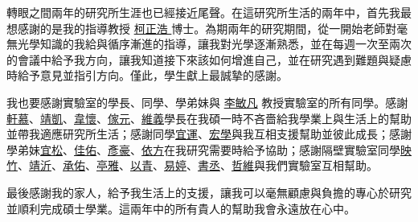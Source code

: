 
\begin{acknowledgement}
	\vspace{-1cm}
轉眼之間兩年的研究所生涯也已經接近尾聲。在這研究所生活的兩年中，首先我最想感謝的是我的指導教授 \underline{ 柯正浩 } 博士。為期兩年的研究期間，從一開始老師對毫無光學知識的我給與循序漸進的指導，讓我對光學逐漸熟悉，並在每週一次至兩次的會議中給予我方向，讓我知道接下來該如何增進自己，並在研究遇到難題與疑慮時給予意見並指引方向。僅此，學生獻上最誠摯的感謝。
\par
我也要感謝實驗室的學長、同學、學弟妹與 \underline{李敏凡} 教授實驗室的所有同學。感謝\underline{軒慕}、\underline{靖凱}、\underline{韋懷}、\underline{傢元}、\underline{維義}學長在我碩一時不吝嗇給我學業上與生活上的幫助並帶我適應研究所生活；感謝同學\underline{宜運}、\underline{宏學}與我互相支援幫助並彼此成長；感謝學弟妹\underline{宜松}、\underline{佳佑}、\underline{彥豪}、\underline{依方}在我研究需要時給予協助；感謝隔壁實驗室同學\underline{映竹}、\underline{靖沂}、\underline{承佑}、\underline{亭雅}、\underline{以青}、\underline{易婷}、\underline{書丞}、\underline{哲維}與我們實驗室互相幫助。
\par
最後感謝我的家人，給予我生活上的支援，讓我可以毫無顧慮與負擔的專心於研究並順利完成碩士學業。這兩年中的所有貴人的幫助我會永遠放在心中。
\end{acknowledgement}